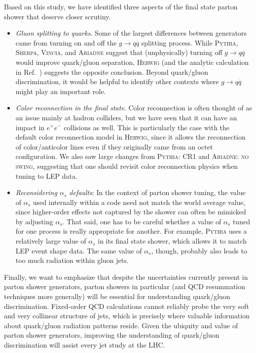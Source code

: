 \documentclass[11pt]{cernrep}
\begin{document}
Based on this study, we have identified three aspects of the final state parton shower that deserve closer scrutiny.
\begin{itemize}
\item \textit{Gluon splitting to quarks}.  Some of the largest differences between generators came from turning on and off the $g \to q \overline{q}$ splitting process.  While \textsc{Pythia}, \textsc{Sherpa}, \textsc{Vincia}, and \textsc{Ariadne} suggest that (unphysically) turning off $g \to q \overline{q}$ would improve quark/gluon separation, \textsc{Herwig} (and the analytic calculation in Ref.~\cite{Larkoski:2013eya}) suggests the opposite conclusion.  Beyond quark/gluon discrimination, it would be helpful to identify other contexts where $g \to q \overline{q}$ might play an important role.
\item \textit{Color reconnection in the final state}.  Color reconnection is often thought of as an issue mainly at hadron colliders, but we have seen that it can have an impact in $e^+ e^-$ collisions as well.  This is particularly the case with the default color reconnection model in \textsc{Herwig}, since it allows the reconnection of color/anticolor lines even if they originally came from an octet configuration.  We also saw large changes from \textsc{Pythia: CR1} and  \textsc{Ariadne: no swing}, suggesting that one should revisit color reconnection physics when tuning to LEP data.
\item \textit{Reconsidering $\alpha_s$ defaults}:  In the context of parton shower tuning, the value of $\alpha_s$ used internally within a code need not match the world average value, since higher-order effects not captured by the shower can often be mimicked by adjusting $\alpha_s$.  That said, one has to be careful whether a value of $\alpha_s$ tuned for one process is really appropriate for another.  For example, \textsc{Pythia} uses a relatively large value of $\alpha_s$ in its final state shower, which allows it to match LEP event shape data.  The same value of $\alpha_s$, though, probably also leads to too much radiation within gluon jets.
\end{itemize}
Finally, we want to emphasize that despite the uncertainties currently present in parton shower generators, parton showers in particular (and QCD resummation techniques more generally) will be essential for understanding quark/gluon discrimination.  Fixed-order QCD calculations cannot reliably probe the very soft and very collinear structure of jets, which is precisely where valuable information about quark/gluon radiation patterns reside.  Given the ubiquity and value of parton shower generators, improving the understanding of quark/gluon discrimination will assist every jet study at the LHC.
\end{document}
